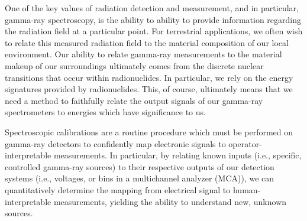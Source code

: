One of the key values of radiation detection and measurement, and in particular,
gamma-ray spectroscopy, is the ability to ability to provide information regarding
the radiation field at a particular point. For terrestrial applications, we
often wish to relate this measured radiation field to the material composition of
our local environment. Our ability to relate gamma-ray measurements to the material
makeup of our surroundings ultimately comes from the discrete nuclear transitions
that occur within radionuclides. In particular, we rely on the energy signatures
provided by radionuclides. This, of course, ultimately means that we need a
method to faithfully relate the output signals of our gamma-ray spectrometers
to energies which have significance to us.


Spectroscopic calibrations are a routine procedure which must be performed on
gamma-ray detectors to confidently map electronic signals to operator-interpretable
measurements. In particular, by relating known inputs (i.e., specific, controlled
gamma-ray sources) to their respective outputs of our detection systems (i.e.,
voltages, or bins in a multichannel analyzer (MCA)), we can quantitatively determine the
mapping from electrical signal to human-interpretable measurements, yielding
the ability to understand new, unknown sources.
